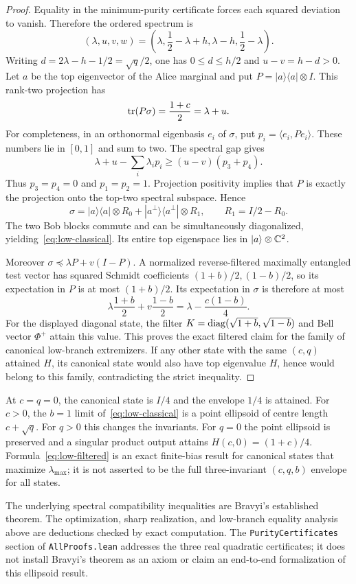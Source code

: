 \begin{proof}
Equality in the minimum-purity certificate forces each squared deviation to vanish. Therefore the ordered spectrum is
\[
 (\lambda,u,v,w)=
 \left(\lambda,\frac12-\lambda+h,\lambda-h,\frac12-\lambda\right).
\]
Writing $d=2\lambda-h-1/2=\sqrt q/2$, one has $0\le d\le h/2$ and $u-v=h-d>0$. Let $a$ be the top eigenvector of the Alice marginal and put $P=|a\rangle\langle a|\otimes I$. This rank-two projection has
\[
 \operatorname{tr}(P\sigma)=\frac{1+c}{2}=\lambda+u.
\]
For completeness, in an orthonormal eigenbasis $e_i$ of $\sigma$, put $p_i=\langle e_i,Pe_i\rangle$. These numbers lie in $[0,1]$ and sum to two. The spectral gap gives
\[
 \lambda+u-\sum_i\lambda_i p_i\ge(u-v)(p_3+p_4).
\]
Thus $p_3=p_4=0$ and $p_1=p_2=1$. Projection positivity implies that $P$ is exactly the projection onto the top-two spectral subspace. Hence
\[
 \sigma=|a\rangle\langle a|\otimes R_0+
        |a^\perp\rangle\langle a^\perp|\otimes R_1,
 \qquad R_1=I/2-R_0.
\]
The two Bob blocks commute and can be simultaneously diagonalized, yielding~\eqref{eq:low-classical}. Its entire top eigenspace lies in $|a\rangle\otimes\mathbb C^2$.

Moreover $\sigma\preceq\lambda P+v(I-P)$. A normalized reverse-filtered maximally entangled test vector has squared Schmidt coefficients $(1+b)/2,(1-b)/2$, so its expectation in $P$ is at most $(1+b)/2$. Its expectation in $\sigma$ is therefore at most
\[
 \lambda\frac{1+b}{2}+v\frac{1-b}{2}
       =\lambda-\frac{c(1-b)}4.
\]
For the displayed diagonal state, the filter $K=\operatorname{diag}(\sqrt{1+b},\sqrt{1-b})$ and Bell vector $\Phi^+$ attain this value. This proves the exact filtered claim for the family of canonical low-branch extremizers. If any other state with the same $(c,q)$ attained $H$, its canonical state would also have top eigenvalue $H$, hence would belong to this family, contradicting the strict inequality.
\end{proof}

At $c=q=0$, the canonical state is $I/4$ and the envelope $1/4$ is attained. For $c>0$, the $b=1$ limit of~\eqref{eq:low-classical} is a point ellipsoid of centre length $c+\sqrt q$. For $q>0$ this changes the invariants. For $q=0$ the point ellipsoid is preserved and a singular product output attains $H(c,0)=(1+c)/4$. Formula~\eqref{eq:low-filtered} is an exact finite-bias result for canonical states that maximize $\lambda_{\max}$; it is not asserted to be the full three-invariant $(c,q,b)$ envelope for all states.

The underlying spectral compatibility inequalities are Bravyi's established theorem. The optimization, sharp realization, and low-branch equality analysis above are deductions checked by exact computation. The \texttt{PurityCertificates} section of \texttt{AllProofs.lean} addresses the three real quadratic certificates; it does not install Bravyi's theorem as an axiom or claim an end-to-end formalization of this ellipsoid result.
